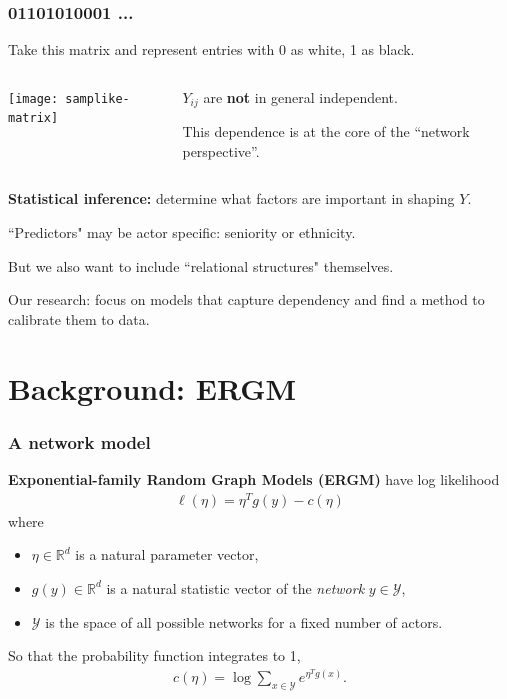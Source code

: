 \documentclass[ 10pt]{beamer}
\def\RR{{\mathbb R}}
\def\YY{{\mathcal Y}}
\newcommand{\fatdot}{\,\cdot\,}
\newcommand{\inner}[1]{\langle #1 \rangle}
\begin{document}
{
\frametitle{01101010001 ...}
Take this matrix and represent entries with 0 as white, 1 as black.
\pause
\begin{columns}[T]
\begin{column}[T]{0.4\textwidth}
\texttt{[image: samplike-matrix]}
\end{column}
\pause
\begin{column}[T]{0.6\textwidth}
\vspace{5mm}

$Y_{ij}$ are \textbf{not} in general independent.
\vspace{2mm}

This dependence is at the core of the ``network perspective''.
\end{column}
\end{columns}
\vspace{2mm}

\pause
\textbf{Statistical inference:} determine what factors are important in shaping 
$Y$.
\vspace{1mm}

``Predictors" may be actor specific: seniority or ethnicity.

But we also want to include ``relational structures" themselves.


\begin{block}{}
Our research: focus on models that capture dependency and find a method to calibrate them to data.
\end{block}
}
\section{Background: ERGM}
\frame
{
\frametitle{A network model}


\textbf{Exponential-family Random Graph Models (ERGM)} have log likelihood
\begin{align*}%
	\ell( \eta) = \eta^T g(y) - c(\eta)
\end{align*}
where 
\begin{itemize}
\item $\eta \in \RR^d$ is a natural parameter vector,
\item $g(y)\in\RR^d$ is a natural statistic vector of the \emph{network} $y\in \YY$,
\item $\YY$ is the space of all possible networks for a fixed number of actors.
\end{itemize}
\vspace{2mm}

So that the probability function integrates to 1,
\begin{align*}
	c(\eta) = \log \sum_{x \in \YY} e^{\eta^T g(x) }.
\end{align*}
}
\end{document}
